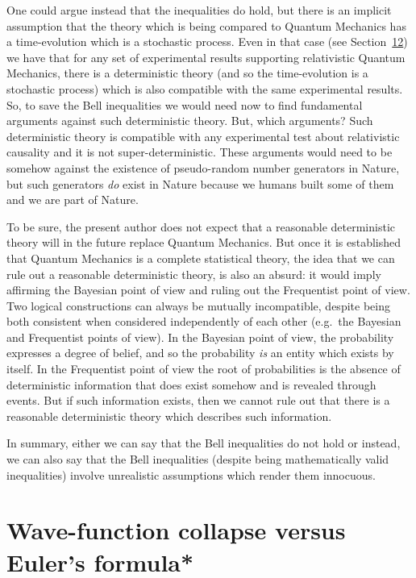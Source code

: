 \documentclass[11pt]{book}
\begin{document}
One could argue instead that the inequalities do hold, but there is an
implicit assumption that the theory which is being compared to Quantum
Mechanics has a time-evolution which is a stochastic process. Even in
that case (see Section~\protect\hyperlink{sec:timetranslation}{12}) we
have that for any set of experimental results supporting relativistic
Quantum Mechanics, there is a deterministic theory (and so the
time-evolution is a stochastic process) which is also compatible with
the same experimental results. So, to save the Bell inequalities we
would need now to find fundamental arguments against such deterministic
theory. But, which arguments? Such deterministic theory is compatible
with any experimental test about relativistic causality and it is not
super-deterministic. These arguments would need to be somehow against
the existence of pseudo-random number generators in Nature, but such
generators \emph{do} exist in Nature because we humans built some of
them and we are part of Nature.

To be sure, the present author does not expect that a reasonable
deterministic theory will in the future replace Quantum Mechanics. But
once it is established that Quantum Mechanics is a complete statistical
theory, the idea that we can rule out a reasonable deterministic theory,
is also an absurd: it would imply affirming the Bayesian point of view
and ruling out the Frequentist point of view. Two logical constructions
can always be mutually incompatible, despite being both consistent when
considered independently of each other (e.g.~the Bayesian and
Frequentist points of view). In the Bayesian point of view, the
probability expresses a degree of belief, and so the probability
\emph{is} an entity which exists by itself. In the Frequentist point of
view the root of probabilities is the absence of deterministic
information that does exist somehow and is revealed through events. But
if such information exists, then we cannot rule out that there is a
reasonable deterministic theory which describes such information.

In summary, either we can say that the Bell inequalities do not hold or
instead, we can also say that the Bell inequalities (despite being
mathematically valid inequalities) involve unrealistic assumptions which
render them innocuous.

\chapter{Wave-function collapse versus Euler's formula*}
\cite{hill_corporate_2002}
\end{document}
